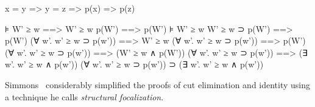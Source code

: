x = y => y = z => p(x) => p(z)

                    ⊧ W' ≥ w
                   ==> W' ≥ w      p(W') ==> p(W')
   ⊧ W' ≥ w         W' ≥ w ⊃ p(W') ==> p(W')
(∀ w'. w' ≥ w ⊃ p(w')) ==> W' ≥ w   (∀ w'. w' ≥ w ⊃ p(w')) ==> p(W')
(∀ w'. w' ≥ w ⊃ p(w')) ==> (W' ≥ w ∧ p(W'))
(∀ w'. w' ≥ w ⊃ p(w')) ==> (∃ w'. w' ≥ w ∧ p(w'))
(∀ w'. w' ≥ w ⊃ p(w')) ⊃ (∃ w'. w' ≥ w ∧ p(w'))



Simmons~\cite{simmons14tocl} considerably simplified the proofs of
cut elimination and identity using a technique he calls
\emph{structural focalization}.

